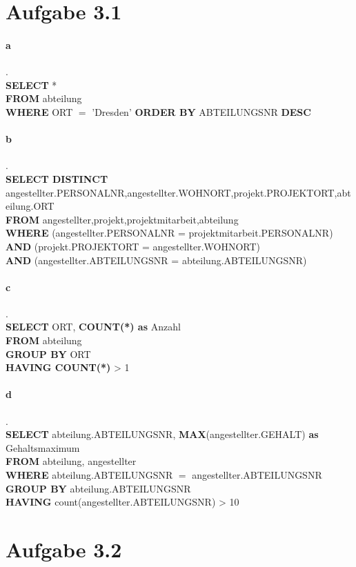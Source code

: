 \documentclass{article}
\begin{document}
	
	
	
	
	\section*{Aufgabe 3.1}
		\paragraph*{a}.\\
			\textbf{SELECT} *\\
			\textbf{FROM} abteilung\\
			\textbf{WHERE} ORT $=$ 'Dresden'
			\textbf{ORDER BY} ABTEILUNGSNR \textbf{DESC}
			
		\paragraph*{b}.\\
			\textbf{SELECT DISTINCT} angestellter.PERSONALNR,angestellter.WOHNORT,projekt.PROJEKTORT,abteilung.ORT\\
			\textbf{FROM} angestellter,projekt,projektmitarbeit,abteilung\\
			\textbf{WHERE} (angestellter.PERSONALNR = projektmitarbeit.PERSONALNR) \textbf{AND} (projekt.PROJEKTORT = angestellter.WOHNORT)\\ \textbf{AND} (angestellter.ABTEILUNGSNR = abteilung.ABTEILUNGSNR)
			
		\paragraph*{c}.\\
			\textbf{SELECT} ORT, \textbf{COUNT(*) as} Anzahl\\
			\textbf{FROM} abteilung\\
			\textbf{GROUP BY} ORT\\
			\textbf{HAVING COUNT(*)} > 1
			
		\paragraph*{d}.\\
			\textbf{SELECT} abteilung.ABTEILUNGSNR, \textbf{MAX}(angestellter.GEHALT) \textbf{as} Gehaltsmaximum\\
			\textbf{FROM} abteilung, angestellter\\
			\textbf{WHERE} abteilung.ABTEILUNGSNR $ = $ angestellter.ABTEILUNGSNR\\
			\textbf{GROUP BY} abteilung.ABTEILUNGSNR\\
			\textbf{HAVING} count(angestellter.ABTEILUNGSNR) > 10
			
	
	\section*{Aufgabe 3.2}
		
			
			
\end{document}
